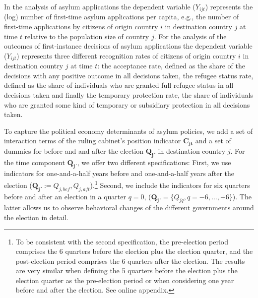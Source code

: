 \documentclass[a4paper,12pt]{article}
\begin{document}
In the analysis of asylum applications the dependent variable ($Y_{ijt}$) represents the (log) number of first-time asylum applications per capita, e.g., the number of first-time applications by citizens of origin country $i$ in destination country $j$ at time $t$ relative to the population size of country $j$. For the analysis of the outcomes of first-instance decisions of asylum applications the dependent variable ($Y_{ijt}$) represents three different recognition rates of citizens of origin country $i$ in destination country $j$ at time $t$: the acceptance rate, defined as the share of the decisions with any positive outcome in all decisions taken, the refugee status rate, defined as the share of individuals who are granted full refugee status in all decisions taken and finally the temporary protection rate, the share of individuals who are granted some kind of temporary or subsidiary protection in all decisions taken. 


To capture the political economy determinants of asylum policies, we add a set of interaction terms of the ruling cabinet's position indicator $\mathbf{C_{jt}}$ and  a set of dummies for before and and after the election $\mathbf{Q_j.}$ in destination country $j$. For the time component $\mathbf{Q_j.}$, we offer two different specifications: First, we use indicators for one-and-a-half years before and one-and-a-half years after the election ($\mathbf{Q_j.} := Q_{j,bef},  Q_{j,aft}$).\footnote{To be consistent with the second specification, the pre-election period comprises the 6 quarters before the election plus the election quarter, and the post-election period comprises the 6 quarters after the election. The results are very similar when defining the 5 quarters before the election plus the election quarter as the pre-election period or when considering one year before and after the election. See online appendix.
} Second, we include the indicators for six quarters before and after an election in a quarter $q=0$, ($\mathbf{Q_j.} =\{Q_{jq}, q = -6, \ldots, +6\}$). The latter allows us to observe behavioral changes of the different governments around the election in detail.
\end{document}
